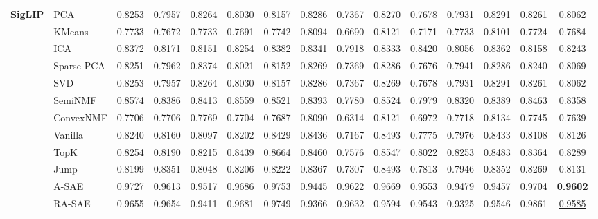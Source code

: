 \begin{table*}[h!]
{{\begin{tabular}{ll|cccccccccccc|c}
\multirow{8}{*}{\textbf{SigLIP}} 
& PCA         & 0.8253 & 0.7957 & 0.8264 & 0.8030 & 0.8157 & 0.8286 & 0.7367 & 0.8270 & 0.7678 & 0.7931 & 0.8291 & 0.8261 & 0.8062 \\
& KMeans      & 0.7733 & 0.7672 & 0.7733 & 0.7691 & 0.7742 & 0.8094 & 0.6690 & 0.8121 & 0.7171 & 0.7733 & 0.8101 & 0.7724 & 0.7684 \\
& ICA         & 0.8372 & 0.8171 & 0.8151 & 0.8254 & 0.8382 & 0.8341 & 0.7918 & 0.8333 & 0.8420 & 0.8056 & 0.8362 & 0.8158 & 0.8243 \\
& Sparse PCA  & 0.8251 & 0.7962 & 0.8374 & 0.8021 & 0.8152 & 0.8269 & 0.7369 & 0.8286 & 0.7676 & 0.7941 & 0.8286 & 0.8240 & 0.8069 \\
& SVD         & 0.8253 & 0.7957 & 0.8264 & 0.8030 & 0.8157 & 0.8286 & 0.7367 & 0.8269 & 0.7678 & 0.7931 & 0.8291 & 0.8261 & 0.8062 \\
& SemiNMF     & 0.8574 & 0.8386 & 0.8413 & 0.8559 & 0.8521 & 0.8393 & 0.7780 & 0.8524 & 0.7979 & 0.8320 & 0.8389 & 0.8463 & 0.8358 \\
& ConvexNMF   & 0.7706 & 0.7706 & 0.7769 & 0.7704 & 0.7687 & 0.8090 & 0.6314 & 0.8121 & 0.6972 & 0.7718 & 0.8134 & 0.7745 & 0.7639 \\
& Vanilla     & 0.8240 & 0.8160 & 0.8097 & 0.8202 & 0.8429 & 0.8436 & 0.7167 & 0.8493 & 0.7775 & 0.7976 & 0.8433 & 0.8108 & 0.8126 \\
& TopK        & 0.8254 & 0.8190 & 0.8215 & 0.8439 & 0.8664 & 0.8460 & 0.7576 & 0.8547 & 0.8022 & 0.8253 & 0.8483 & 0.8364 & 0.8289 \\
& Jump        & 0.8199 & 0.8351 & 0.8048 & 0.8206 & 0.8222 & 0.8367 & 0.7307 & 0.8493 & 0.7813 & 0.7946 & 0.8352 & 0.8269 & 0.8131 \\
& A-SAE       & 0.9727 & 0.9613 & 0.9517 & 0.9686 & 0.9753 & 0.9445 & 0.9622 & 0.9669 & 0.9553 & 0.9479 & 0.9457 & 0.9704 & \textbf{0.9602} \\
& RA-SAE       & 0.9655 & 0.9654 & 0.9411 & 0.9681 & 0.9749 & 0.9366 & 0.9632 & 0.9594 & 0.9543 & 0.9325 & 0.9546 & 0.9861 & \underline{0.9585} \\

\midrule


\end{tabular}}}
\end{table*}
